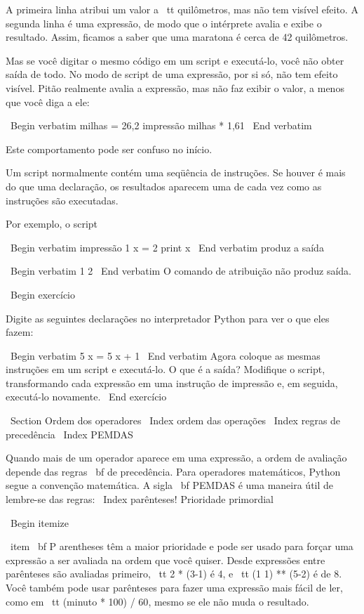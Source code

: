 \documentclass[10pt]{book}
\begin{document}
{A primeira linha atribui um valor a {\ tt quilômetros}, mas não tem visível
efeito. A segunda linha é uma expressão, de modo que o intérprete
avalia e exibe o resultado. Assim, ficamos a saber que uma maratona é
cerca de 42 quilômetros.

Mas se você digitar o mesmo código em um script e executá-lo, você não obter
saída de todo. No modo de script de uma expressão, por si só, não tem
efeito visível. Pitão realmente avalia a expressão, mas não faz
exibir o valor, a menos que você diga a ele:

\ Begin {verbatim}
milhas = 26,2
impressão milhas * 1,61
\ End {verbatim}

Este comportamento pode ser confuso no início.

Um script normalmente contém uma seqüência de instruções. Se houver
é mais do que uma declaração, os resultados aparecem uma de cada vez
como as instruções são executadas.

Por exemplo, o script

\ Begin {verbatim}
impressão 1
x = 2
print x
\ End {verbatim}
%
produz a saída

\ Begin {verbatim}
1
2
\ End {verbatim}
%
O comando de atribuição não produz saída.

\ Begin {} exercício

Digite as seguintes declarações no interpretador Python para ver
o que eles fazem:

\ Begin {verbatim}
5
x = 5
x + 1
\ End {verbatim}
%
Agora coloque as mesmas instruções em um script e executá-lo. O que
é a saída? Modifique o script, transformando cada
expressão em uma instrução de impressão e, em seguida, executá-lo novamente.
\ End {} exercício


\ Section {Ordem dos operadores}
\ Index {ordem das operações}
\ Index {regras de precedência}
\ Index {} PEMDAS

Quando mais de um operador aparece em uma expressão, a ordem de
avaliação depende das regras {\ bf de precedência}. Para
operadores matemáticos, Python segue a convenção matemática.
A sigla {\ bf PEMDAS} é uma maneira útil de
lembre-se das regras:
\ Index {parênteses! Prioridade primordial}

\ Begin {itemize}

\ item {\ bf P} arentheses têm a maior prioridade e pode ser usado 
para forçar uma expressão a ser avaliada na ordem que você quiser. Desde
expressões entre parênteses são avaliadas primeiro, {\ tt 2 * (3-1)} é 4,
e {\ tt (1 1) ** (5-2)} é de 8. Você também pode usar parênteses para fazer uma
expressão mais fácil de ler, como em {\ tt (minuto * 100) / 60}, mesmo
se ele não muda o resultado.

}
\end{document}
